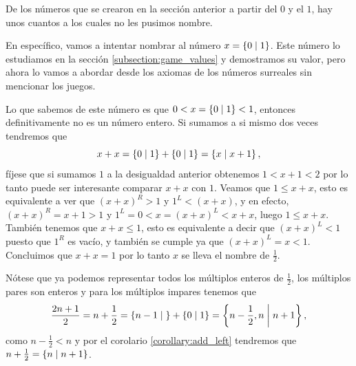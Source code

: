     \begin{example}
        De los n\'umeros que se crearon en la secci\'on anterior a partir del $0$ y el $1$, hay unos cuantos a los cuales no les pusimos nombre.

        En espec\'ifico, vamos a intentar nombrar al n\'umero $x = \left\{0\;\middle|\; 1\right\}$. Este n\'umero lo estudiamos en la secci\'on \ref{subsection:game_values} y demostramos su valor, pero ahora lo vamos a abordar desde los axiomas de los n\'umeros surreales sin mencionar los juegos. 
        
        Lo que sabemos de este n\'umero es que $0 < x = \left\{0\;\middle|\; 1\right\} < 1$, entonces definitivamente no es un n\'umero entero. Si sumamos a si mismo dos veces tendremos que
        \[
            x + x = \left\{0\;\middle|\; 1\right\} + \left\{0\;\middle|\; 1\right\} = \left\{x\;\middle|\; x+1\right\},
        \]
        f\'ijese que si sumamos $1$ a la desigualdad anterior obtenemos $1 < x+1 < 2$ por lo tanto puede ser interesante comparar $x+x$ con $1$. Veamos que $1 \le x+x$, esto es equivalente a ver que $(x+x)^R > 1$ y $1^L < (x+x)$, y en efecto, $(x+x)^R = x+1 > 1$ y $1^L = 0 < x = (x+x)^L < x+x$, luego $1 \le x+x$. Tambi\'en tenemos que $x+x \le 1$, esto es equivalente a decir que $(x+x)^L < 1$ puesto que $1^R$ es vac\'io, y tambi\'en se cumple ya que $(x+x)^L = x < 1$. Concluimos que $x+x = 1$ por lo tanto $x$ se lleva el nombre de $\frac{1}{2}$.

        N\'otese que ya podemos representar todos los m\'ultiplos enteros de $\frac{1}{2}$, los m\'ultiplos pares son enteros y para los m\'ultiplos impares tenemos que 
        \[
            \frac{2n+1}{2} = n+\frac{1}{2} = \left\{n-1\;\middle|\; \right\} + \left\{0\;\middle|\; 1\right\} = \left\{n-\frac{1}{2}, n\;\middle|\; n+1\right\},
        \]
        como $n-\frac{1}{2} < n$ y por el corolario \ref{corollary:add_left} tendremos que $n+\frac{1}{2} = \left\{n\;\middle|\; n+1\right\}$.
    \end{example}

